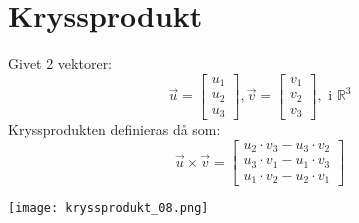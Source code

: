
\section{Kryssprodukt} %
\label{sec:kryssprodukt}
\begin{Def}
    Givet 2 vektorer:
    \[
        \vec{u} = \begin{bmatrix} u_1 \\ u_2 \\ u_3 \end{bmatrix}, \vec{v} = \begin{bmatrix} v_1 \\ v_2 \\ v_3 \end{bmatrix}, \mbox{ i } \mathbb{R}^3
    \]
    Kryssprodukten definieras då som:
    \begin{equation}
        \vec{u} \times \vec{v} = \begin{bmatrix} u_2 \cdot v_3 - u_3 \cdot v_2 \\ u_3 \cdot v_1 - u_1 \cdot v_3 \\ u_1 \cdot v_2 - u_2 \cdot v_1\end{bmatrix}
    \end{equation}
    
\end{Def}
\begin{center}
  \texttt{[image: kryssprodukt\_08.png]}
\end{center}
\noindent

